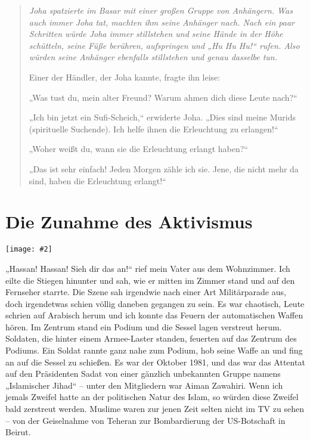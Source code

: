 \documentclass[12pt]{memoir}
\newcommand{\img}[3]{\begin{center}%
\texttt{[image: \#2]}\\{\small\em#3}%
\end{center}}
\begin{document}
\begin{quote}
\itshape
Joha spatzierte im Basar mit einer großen Gruppe von Anhängern.
Was auch immer Joha tat, machten ihm seine Anhänger nach.
Nach ein paar Schritten würde Joha immer stillstehen
und seine Hände in der Höhe schütteln,
seine Füße berühren, aufspringen und „Hu Hu Hu!“ rufen.
Also würden seine Anhänger ebenfalls stillstehen
und genau dasselbe tun.

Einer der Händler, der Joha kannte, fragte ihn leise:

„Was tust du, mein alter Freund?
Warum ahmen dich diese Leute nach?“

„Ich bin jetzt ein Sufi-Scheich,“ erwiderte Joha.
„Dies sind meine Murids (spirituelle Suchende).
Ich helfe ihnen die Erleuchtung zu erlangen!“

„Woher weißt du, wann sie die Erleuchtung erlangt haben?“

„Das ist sehr einfach! Jeden Morgen zähle ich sie.
Jene, die nicht mehr da sind, haben die Erleuchtung erlangt!“
\end{quote}


\chapter{Die Zunahme des Aktivismus}

\img{scale=0.7}{Assassination_of_Sadat.jpg}{}

„Hassan! Hassan! Sieh dir das an!“
rief mein Vater aus dem Wohnzimmer.
Ich eilte die Stiegen hinunter und sah, wie er mitten
im Zimmer stand und auf den Fernseher starrte.
Die Szene sah irgendwie nach einer Art Militärparade aus,
doch irgendetwas schien völlig daneben gegangen zu sein.
Es war chaotisch, Leute schrien auf Arabisch herum
und ich konnte das Feuern der automatischen Waffen hören.
Im Zentrum stand ein Podium und die Sessel lagen verstreut herum.
Soldaten, die hinter einem Armee-Laster standen,
feuerten auf das Zentrum des Podiums.
Ein Soldat rannte ganz nahe zum Podium,
hob seine Waffe an und fing an auf die Sessel zu schießen.
Es war der Oktober 1981, und das war das Attentat auf den Präsidenten Sadat
von einer gänzlich unbekannten Gruppe namens „Islamischer Jihad“ –
unter den Mitgliedern war Aiman Zawahiri.
Wenn ich jemals Zweifel hatte an der politischen Natur des Islam,
so würden diese Zweifel bald zerstreut werden.
Muslime waren zur jenen Zeit selten nicht im TV zu sehen –
von der Geiselnahme von Teheran zur Bombardierung der US-Botschaft in Beirut.
\end{document}
